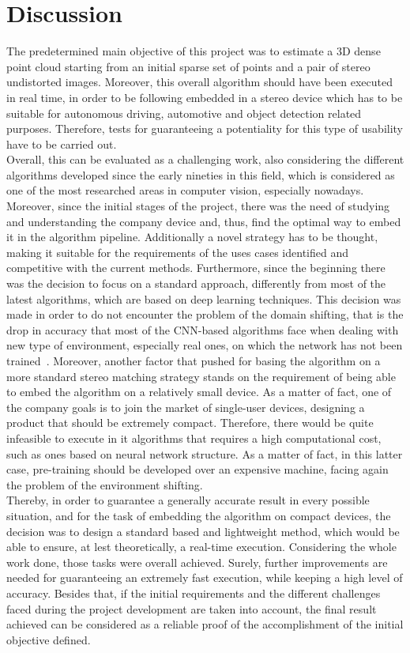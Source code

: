 \chapter{Discussion}
\label{chapter:discussion}

The predetermined main objective of this project was to estimate a 3D dense point cloud starting from an initial sparse set of points and a pair of stereo undistorted images.
Moreover, this overall algorithm should have been executed in real time, in order to be following embedded in a stereo device which has to be suitable for autonomous driving, automotive and object detection related purposes.
Therefore, tests for guaranteeing a potentiality for this type of usability have to be carried out. \\
Overall, this can be evaluated as a challenging work, also considering the different algorithms developed since the early nineties in this field, which is considered as one of the most researched areas in computer vision, especially nowadays.\\
Moreover, since the initial stages of the project, there was the need of studying and understanding the company device and, thus, find the optimal way to embed it in the algorithm pipeline.
Additionally a novel strategy has to be thought, making it suitable for the requirements of the uses cases identified and competitive with the current methods.
Furthermore, since the beginning there was the decision to focus on a standard approach, differently from most of the latest algorithms, which are based on deep learning techniques.  
This decision was made in order to do not encounter the problem of the domain shifting, that is the drop in accuracy that most of the CNN-based algorithms face when dealing with new type of environment, especially real ones, on which the network has not been trained~\cite{Poggi2019}.
Moreover, another factor that pushed for basing the algorithm on a more standard stereo matching strategy stands on the requirement of being able to embed the algorithm on a relatively small device.
As a matter of fact, one of the company goals is to join the market of single-user devices, designing a product that should be extremely compact.
Therefore, there would be quite infeasible to execute in it algorithms that requires a high computational cost, such as ones based on neural network structure.
As a matter of fact, in this latter case, pre-training should be developed over an expensive machine, facing again the problem of the environment shifting. \\
Thereby, in order to guarantee a generally accurate result in every possible situation, and for the task of embedding the algorithm on compact devices, the decision was to design a standard based and lightweight method, which would be able to ensure, at lest theoretically, a real-time execution.
Considering the whole work done, those tasks were overall achieved.
Surely, further improvements are needed for guaranteeing an extremely fast execution, while keeping a high level of accuracy.
Besides that, if the initial requirements and the different challenges faced during the project development are taken into account, the final result achieved can be considered as a reliable proof of the accomplishment of the initial objective defined.

